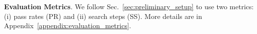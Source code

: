\noindent \textbf{Evaluation Metrics}.  We follow Sec.~\ref{sec:preliminary_setup} to use two metrics: (i) pass rates (PR) and (ii) search steps (SS).  More details are in Appendix~\ref{appendix:evaluation_metrics}. 




